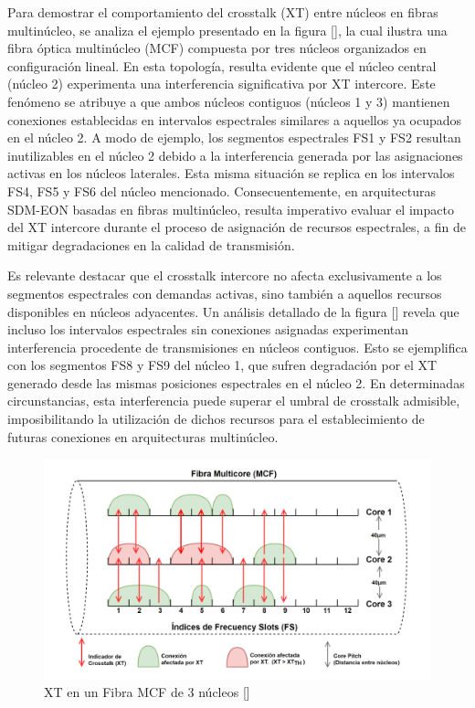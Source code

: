 Para demostrar el comportamiento del crosstalk (XT) entre núcleos en fibras multinúcleo, se analiza el ejemplo presentado en la figura [], la cual ilustra una fibra óptica multinúcleo (MCF) compuesta por tres núcleos organizados en configuración lineal.
En esta topología, resulta evidente que el núcleo central (núcleo 2) experimenta una interferencia significativa por XT intercore. Este fenómeno se atribuye a que ambos núcleos contiguos (núcleos 1 y 3) mantienen conexiones establecidas en intervalos espectrales similares a aquellos ya ocupados en el núcleo 2.
A modo de ejemplo, los segmentos espectrales FS1 y FS2 resultan inutilizables en el núcleo 2 debido a la interferencia generada por las asignaciones activas en los núcleos laterales.
Esta misma situación se replica en los intervalos FS4, FS5 y FS6 del núcleo mencionado. Consecuentemente, en arquitecturas SDM-EON basadas en fibras multinúcleo, resulta imperativo evaluar el impacto del XT intercore durante el proceso de asignación de recursos espectrales, a fin de mitigar degradaciones en la calidad de transmisión.

Es relevante destacar que el crosstalk intercore no afecta exclusivamente a los segmentos espectrales con demandas activas, sino también a aquellos recursos disponibles en núcleos adyacentes. Un análisis detallado de la figura [] revela que incluso los intervalos espectrales sin conexiones asignadas experimentan interferencia procedente de transmisiones en núcleos contiguos.
 Esto se ejemplifica con los segmentos FS8 y FS9 del núcleo 1, que sufren degradación por el XT generado desde las mismas posiciones espectrales en el núcleo 2. En determinadas circunstancias, esta interferencia puede superar el umbral de crosstalk admisible, imposibilitando la utilización de dichos recursos para el establecimiento de futuras conexiones en arquitecturas multinúcleo.


\begin{figure}[H]
    \centering
    \includegraphics[width=1\textwidth]{capitulos/img/XT_MCF.png}
    \caption{XT en un Fibra MCF de 3 núcleos []}
    \label{fig:XT_MCF}
\end{figure}
%


